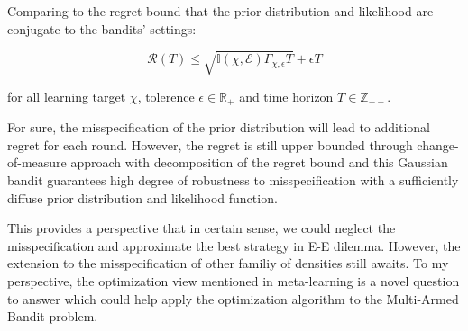 \documentclass{article}
\begin{document}
Comparing to the regret bound that the prior distribution and likelihood are conjugate to the bandits' settings:

\begin{equation}
  \mathcal{R}(T) \leq \sqrt{\mathbb{I}(\chi,\mathcal{E})\Gamma_{\chi,\epsilon} T} + \epsilon T
\end{equation}

for all learning target $\chi$, tolerence $\epsilon \in \mathbb{R}_+$ and time horizon $T \in \mathbb{Z}_{++}$.

For sure, the misspecification of the prior distribution will lead to additional regret for each round. However,  the regret is still upper bounded through change-of-measure approach with decomposition of the regret bound and this Gaussian bandit guarantees high degree of robustness to misspecification with a sufficiently diffuse prior distribution and likelihood function. 

This provides a perspective that in certain sense, we could neglect the misspecification and approximate the best strategy in E-E dilemma. However, the extension to the misspecification of other familiy of densities still awaits. To my perspective, the optimization view mentioned in meta-learning is a novel question to answer which could help apply the optimization algorithm to the Multi-Armed Bandit problem. 

\newpage



\end{document}
